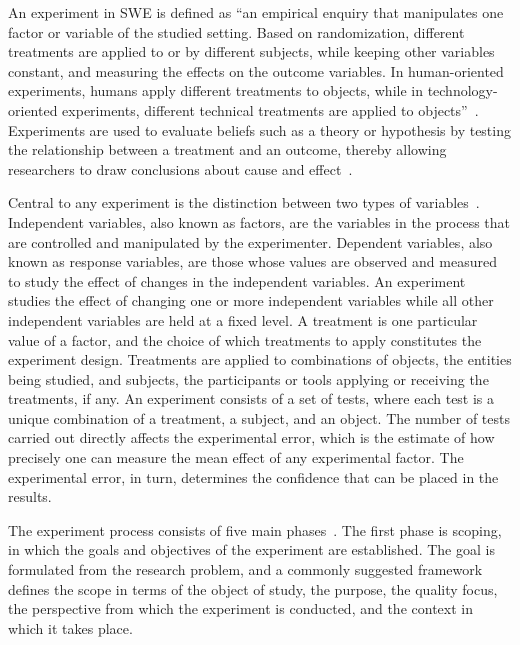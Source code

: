 \documentclass[
english,                 %
bibtex,                  %
]{kththesis}
\numberwithin{listing}{chapter}
\begin{document}
An experiment in \gls{SWE} is defined as ``an empirical enquiry that manipulates one factor or variable of the studied setting. Based on randomization, different treatments are applied to or by different subjects, while keeping other variables constant, and measuring the effects on the outcome variables. In human-oriented experiments, humans apply different treatments to objects, while in technology-oriented experiments, different technical treatments are applied to objects''~\cite{wohlin_experimentation_2024}. Experiments are used to evaluate beliefs such as a theory or hypothesis by testing the relationship between a treatment and an outcome, thereby allowing researchers to draw conclusions about cause and effect~\cite{bacon_novum_1995}.

Central to any experiment is the distinction between two types of variables~\cite{wohlin_experimentation_2024}. Independent variables, also known as factors, are the variables in the process that are controlled and manipulated by the experimenter. Dependent variables, also known as response variables, are those whose values are observed and measured to study the effect of changes in the independent variables. An experiment studies the effect of changing one or more independent variables while all other independent variables are held at a fixed level. A treatment is one particular value of a factor, and the choice of which treatments to apply constitutes the experiment design. Treatments are applied to combinations of objects, the entities being studied, and subjects, the participants or tools applying or receiving the treatments, if any. An experiment consists of a set of tests, where each test is a unique combination of a treatment, a subject, and an object. The number of tests carried out directly affects the experimental error, which is the estimate of how precisely one can measure the mean effect of any experimental factor. The experimental error, in turn, determines the confidence that can be placed in the results.

The experiment process consists of five main phases~\cite{wohlin_experimentation_2024}. The first phase is scoping, in which the goals and objectives of the experiment are established. The goal is formulated from the research problem, and a commonly suggested framework defines the scope in terms of the object of study, the purpose, the quality focus, the perspective from which the experiment is conducted, and the context in which it takes place.
\end{document}

